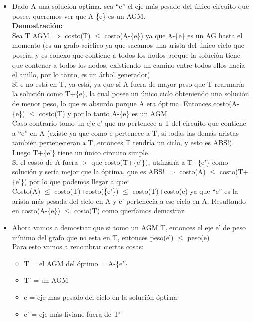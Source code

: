 \begin{itemize}


	\item	Dado A una solucion optima, sea “e” el eje más pesado del único circuito que posee, queremos ver que A-\{e\} es un AGM.\\


	\textbf{Demostración:} \\
	Sea T AGM $\Longrightarrow$ costo(T) $\leq$ costo(A-\{e\}) ya que A-\{e\} es un AG hasta el momento (es un grafo acíclico ya que sacamos una arista del único ciclo que poseía, y es conexo que contiene a todos los nodos porque la solución tiene que contener a todos los nodos, existiendo un camino entre todos ellos hacia el anillo, por lo tanto, es un árbol generador).\\
	Si e no está en T, ya está, ya que si A fuera de mayor peso que T rearmaría la solución como T+\{e\}, la cual posee un único ciclo obteniendo una solución de menor peso, lo que es absurdo porque A era óptima. Entonces costo(A-\{e\}) $\leq$ costo(T) y por lo tanto A-\{e\} es un AGM.\\
	Caso contrario tomo un eje e’ que no pertenece a T del circuito que contiene a “e” en A (existe ya que como e pertenece a T, si todas las demás aristas también pertenecieran a T, entonces T tendría un ciclo, y esto es ABS!). Luego T+\{e'\} tiene un único circuito simple. \\
	 Si el costo de A fuera $>$ que costo(T+\{e'\}), utilizaría a T+\{e'\} como solución y sería mejor que la óptima, que es ABS! $\Rightarrow$ costo(A) $\leq$ costo(T+\{e'\}) por lo que podemos llegar a que: \\
	
	Costo(A) $\leq$ costo(T)+costo(\{e'\}) $\leq$ costo(T)+costo(e) ya que “e” es la arista más pesada del ciclo en A y e’ pertenecía a ese ciclo en A. Resultando en costo(A-\{e\}) $\leq$ costo(T) como queríamos demostrar. \\
	
	




	\item	Ahora vamos a demostrar que si tomo un AGM T, entonces el eje e’ de peso mínimo del grafo que no esta en T, entonces peso(e’) $\leq$ peso(e)\\
	
Para esto vamos a renombrar ciertas cosas:

\begin{itemize}
	\item	T = el AGM del óptimo = A-\{e'\}
	\item	T’ = un AGM
	\item	e = eje mas pesado del ciclo en la solución óptima
	\item	e’ = eje más liviano fuera de T’
\end{itemize}


\end{itemize}
